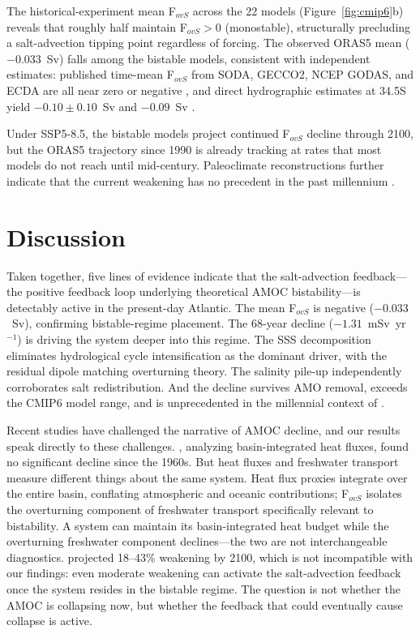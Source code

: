 \documentclass{agujournal2019}
\begin{document}
The historical-experiment mean F$_{ovS}$ across the 22 models (Figure~\ref{fig:cmip6}b) reveals that roughly half maintain F$_{ovS} > 0$ (monostable), structurally precluding a salt-advection tipping point regardless of forcing. The observed ORAS5 mean ($-0.033$~Sv) falls among the bistable models, consistent with independent estimates: published time-mean F$_{ovS}$ from SODA, GECCO2, NCEP GODAS, and ECDA are all near zero or negative \cite{Weijer2019}, and direct hydrographic estimates at 34.5\textdegree S yield $-0.10 \pm 0.10$~Sv \cite{GarzoliMatano2011} and $-0.09$~Sv \cite{Meinen2018}.

Under SSP5-8.5, the bistable models project continued F$_{ovS}$ decline through 2100, but the ORAS5 trajectory since 1990 is already tracking at rates that most models do not reach until mid-century. Paleoclimate reconstructions further indicate that the current weakening has no precedent in the past millennium \cite{Caesar2021}.


\section{Discussion}

Taken together, five lines of evidence indicate that the salt-advection feedback---the positive feedback loop underlying theoretical AMOC bistability---is detectably active in the present-day Atlantic. The mean F$_{ovS}$ is negative ($-0.033$~Sv), confirming bistable-regime placement. The 68-year decline ($-1.31$~mSv~yr$^{-1}$) is driving the system deeper into this regime. The SSS decomposition eliminates hydrological cycle intensification as the dominant driver, with the residual dipole matching overturning theory. The salinity pile-up independently corroborates salt redistribution. And the decline survives AMO removal, exceeds the CMIP6 model range, and is unprecedented in the millennial context of .

Recent studies have challenged the narrative of AMOC decline, and our results speak directly to these challenges. , analyzing basin-integrated heat fluxes, found no significant decline since the 1960s. But heat fluxes and freshwater transport measure different things about the same system. Heat flux proxies integrate over the entire basin, conflating atmospheric and oceanic contributions; F$_{ovS}$ isolates the overturning component of freshwater transport specifically relevant to bistability. A system can maintain its basin-integrated heat budget while the overturning freshwater component declines---the two are not interchangeable diagnostics.  projected 18--43\% weakening by 2100, which is not incompatible with our findings: even moderate weakening can activate the salt-advection feedback once the system resides in the bistable regime. The question is not whether the AMOC is collapsing now, but whether the feedback that could eventually cause collapse is active.
\end{document}
